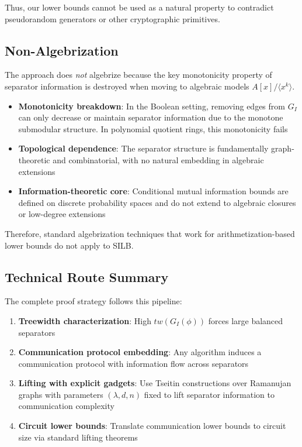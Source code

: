 \documentclass[11pt]{article}
\begin{document}
Thus, our lower bounds cannot be used as a natural property to contradict pseudorandom generators or other cryptographic primitives.

\subsection{Non-Algebrization}

The approach does \emph{not} algebrize because the key monotonicity property of separator information is destroyed when moving to algebraic models $A[x]/\langle x^k \rangle$.

\begin{itemize}
\item \textbf{Monotonicity breakdown}: In the Boolean setting, removing edges from $G_I$ can only decrease or maintain separator information due to the monotone submodular structure. In polynomial quotient rings, this monotonicity fails
\item \textbf{Topological dependence}: The separator structure is fundamentally graph-theoretic and combinatorial, with no natural embedding in algebraic extensions
\item \textbf{Information-theoretic core}: Conditional mutual information bounds are defined on discrete probability spaces and do not extend to algebraic closures or low-degree extensions
\end{itemize}

Therefore, standard algebrization techniques that work for arithmetization-based lower bounds do not apply to SILB.

\subsection{Technical Route Summary}

The complete proof strategy follows this pipeline:
\begin{enumerate}
\item \textbf{Treewidth characterization}: High $tw(G_I(\phi))$ forces large balanced separators
\item \textbf{Communication protocol embedding}: Any algorithm induces a communication protocol with information flow across separators
\item \textbf{Lifting with explicit gadgets}: Use Tseitin constructions over Ramanujan graphs with parameters $(\lambda, d, n)$ fixed to lift separator information to communication complexity
\item \textbf{Circuit lower bounds}: Translate communication lower bounds to circuit size via standard lifting theorems
\end{enumerate}
\end{document}
